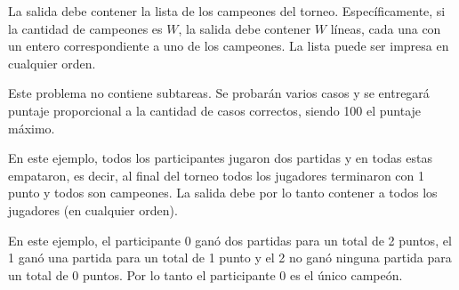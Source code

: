 \documentclass{oci}
\begin{document}
\begin{outputDescription}
  La salida debe contener la lista de los campeones del torneo.
  Específicamente, si la cantidad de campeones es $W$, la salida debe contener
  $W$ líneas, cada una con un entero correspondiente a uno de los campeones.
  La lista puede ser impresa en cualquier orden.
\end{outputDescription}

\begin{scoreDescription}
  Este problema no contiene subtareas.
  Se probarán varios casos y se entregará puntaje proporcional a la cantidad de casos correctos,
  siendo 100 el puntaje máximo.
\end{scoreDescription}

\begin{sampleDescription}
\vspace{-1em}
En este ejemplo, todos los participantes jugaron dos partidas y en todas estas empataron, es decir,
al final del torneo todos los jugadores terminaron con 1 punto y todos son campeones.
La salida debe por lo tanto contener a todos los jugadores (en cualquier orden).
\vspace{1em}

\vspace{-1em}
En este ejemplo, el participante 0 ganó dos partidas para un total de 2 puntos, el 1 ganó una partida
para un total de 1 punto y el 2 no ganó ninguna partida para un total de 0 puntos.
Por lo tanto el participante 0 es el único campeón.
\end{sampleDescription}
\vspace{1em}
\end{document}
